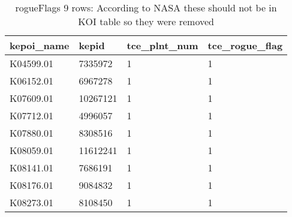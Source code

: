 \begin{table}[!htbp]
	\centering
	\caption{rogueFlags 9 rows: According to NASA these should not be in KOI table so they were removed}
	\label{tbl:data/rogueFlags.csv}
\begin{tabular}
{| 
 p{}| 
 p{}| 
 p{}| 
 p{}| 
}\hline 
\textbf{kepoi\_name} &\textbf{kepid} &\textbf{tce\_plnt\_num} &\textbf{tce\_rogue\_flag} \\ \hline 
K04599.01 &7335972 &1 &1 \\ \hline 
K06152.01 &6967278 &1 &1 \\ \hline 
K07609.01 &10267121 &1 &1 \\ \hline 
K07712.01 &4996057 &1 &1 \\ \hline 
K07880.01 &8308516 &1 &1 \\ \hline 
K08059.01 &11612241 &1 &1 \\ \hline 
K08141.01 &7686191 &1 &1 \\ \hline 
K08176.01 &9084832 &1 &1 \\ \hline 
K08273.01 &8108450 &1 &1 \\ \hline 
\end{tabular}
\end{table}